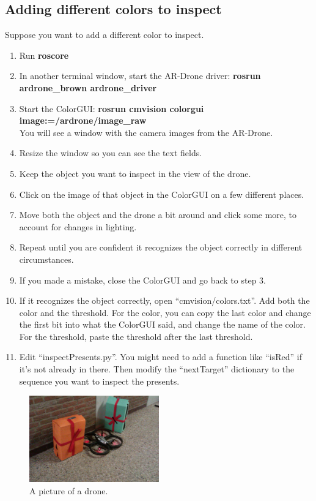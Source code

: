 \documentclass[a4paper,10pt]{article}
\begin{document}
\subsection{Adding different colors to inspect}
Suppose you want to add a different color to inspect.
\begin{enumerate}
\item Run \textbf{roscore}
\item In another terminal window, start the AR-Drone driver: \textbf{rosrun ardrone\_brown ardrone\_driver}
\item Start the ColorGUI: \textbf{rosrun cmvision colorgui image:=/ardrone/image\_raw} \\
      You will see a window with the camera images from the AR-Drone.
\item Resize the window so you can see the text fields.
\item Keep the object you want to inspect in the view of the drone.
\item Click on the image of that object in the ColorGUI on a few different places.
\item Move both the object and the drone a bit around and click some more, to account for changes in lighting.
\item Repeat until you are confident it recognizes the object correctly in different circumstances.
\item If you made a mistake, close the ColorGUI and go back to step 3.
\item If it recognizes the object correctly, open ``cmvision/colors.txt''. Add both the color and the threshold. For the color, you can copy the last color and change the first bit into what the ColorGUI said, and change the name of the color. For the threshold, paste the threshold after the last threshold.
\item Edit ``inspectPresents.py''. You might need to add a function like ``isRed'' if it's not already in there. Then modify the ``nextTarget'' dictionary to the sequence you want to inspect the presents.
\end{enumerate}

\begin{figure}[h!]
	\caption{A picture of a drone.}
	\centering
	\includegraphics[width=0.5\textwidth]{images/presentsAndDrone}
\end{figure}
\end{document}
